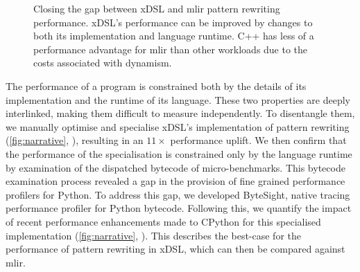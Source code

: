 

\begin{figure}
    \centering
    \caption{Closing the gap between xDSL and \ac{mlir} pattern rewriting performance. xDSL's performance can be improved by changes to both its implementation and language runtime. C++ has less of a performance advantage for \ac{mlir} than other workloads due to the costs associated with dynamism.}
    \label{fig:narrative}
\end{figure}

The performance of a program is constrained both by the details of its implementation and the runtime of its language.
These two properties are deeply interlinked, making them difficult to measure independently.
To disentangle them, we manually optimise and specialise xDSL's implementation of pattern rewriting (\autoref{fig:narrative}, ), resulting in an $11\times$ performance uplift. %
We then confirm that the performance of the specialisation is constrained only by the language runtime by examination of the dispatched bytecode of micro-benchmarks.
This bytecode examination process revealed a gap in the provision of fine grained performance profilers for Python. To address this gap, we developed ByteSight, native tracing performance profiler for Python bytecode. %
Following this, we quantify the impact of recent performance enhancements made to CPython for this specialised implementation (\autoref{fig:narrative}, ). %
This describes the best-case for the performance of pattern rewriting in xDSL, which can then be compared against \ac{mlir}.


